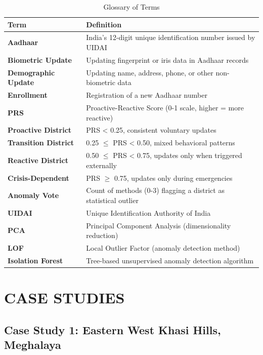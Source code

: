 \documentclass[11pt, a4paper]{article}
\begin{document}
\vspace{0.8em}
\begin{table}[H]
\caption{Glossary of Terms}
{\small
\begin{tabularx}{\textwidth}{|Y|Y|}
\hline
\textbf{Term} & \textbf{Definition} \\ \hline
\textbf{Aadhaar} & India's 12-digit unique identification number issued by UIDAI \\ \hline
\textbf{Biometric Update} & Updating fingerprint or iris data in Aadhaar records \\ \hline
\textbf{Demographic Update} & Updating name, address, phone, or other non-biometric data \\ \hline
\textbf{Enrollment} & Registration of a new Aadhaar number \\ \hline
\textbf{PRS} & Proactive-Reactive Score (0-1 scale, higher = more reactive) \\ \hline
\textbf{Proactive District} & PRS < 0.25, consistent voluntary updates \\ \hline
\textbf{Transition District} & 0.25 $\le$ PRS < 0.50, mixed behavioral patterns \\ \hline
\textbf{Reactive District} & 0.50 $\le$ PRS < 0.75, updates only when triggered externally \\ \hline
\textbf{Crisis-Dependent} & PRS $\ge$ 0.75, updates only during emergencies \\ \hline
\textbf{Anomaly Vote} & Count of methods (0-3) flagging a district as statistical outlier \\ \hline
\textbf{UIDAI} & Unique Identification Authority of India \\ \hline
\textbf{PCA} & Principal Component Analysis (dimensionality reduction) \\ \hline
\textbf{LOF} & Local Outlier Factor (anomaly detection method) \\ \hline
\textbf{Isolation Forest} & Tree-based unsupervised anomaly detection algorithm \\ \hline
\end{tabularx}
}
\end{table}
\vspace{1em}



\section{CASE STUDIES}

\subsection{Case Study 1: Eastern West Khasi Hills, Meghalaya}
\end{document}
